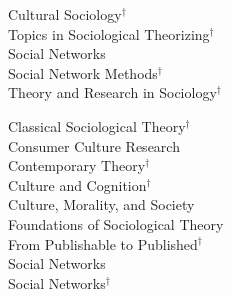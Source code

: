 \begin{multicols}{2}
[]
\noindent
Cultural Sociology\textcolor{uclablue}{$^\dag$} \\
Topics in Sociological Theorizing\textcolor{uclablue}{$^\dag$}  \\
Social Networks \\
Social Network Methods\textcolor{uclablue}{$^\dag$} \\
Theory and Research in Sociology\textcolor{uclablue}{$^\dag$} \\
\end{multicols}  
\medskip
\begin{multicols}{2}
[]
\noindent
Classical Sociological Theory\textcolor{uclablue}{$^\dag$}   \\
Consumer Culture Research  \\
Contemporary Theory\textcolor{uclablue}{$^\dag$}  \\
Culture and Cognition\textcolor{uclablue}{$^\dag$}  \\
Culture, Morality, and Society  \\
Foundations of Sociological Theory  \\
From Publishable to Published\textcolor{uclablue}{$^\dag$}   \\
Social Networks  \\
Social Networks\textcolor{uclablue}{$^\dag$}   
\end{multicols} 